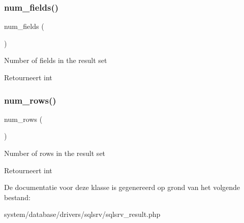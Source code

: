 \subsubsection{\texorpdfstring{num\_fields()}{num\_fields()}}
{\footnotesize\ttfamily num\+\_\+fields (\begin{DoxyParamCaption}{ }\end{DoxyParamCaption})}

Number of fields in the result set

\begin{DoxyReturn}{Retourneert}
int 
\end{DoxyReturn}
\mbox{\label{class_c_i___d_b__sqlsrv__result_a218657c303ee499b97710ab0cd2f5d6e}} 
\subsubsection{\texorpdfstring{num\_rows()}{num\_rows()}}
{\footnotesize\ttfamily num\+\_\+rows (\begin{DoxyParamCaption}{ }\end{DoxyParamCaption})}

Number of rows in the result set

\begin{DoxyReturn}{Retourneert}
int 
\end{DoxyReturn}


De documentatie voor deze klasse is gegenereerd op grond van het volgende bestand\+:\begin{DoxyCompactItemize}
\item 
system/database/drivers/sqlsrv/sqlsrv\+\_\+result.\+php\end{DoxyCompactItemize}

